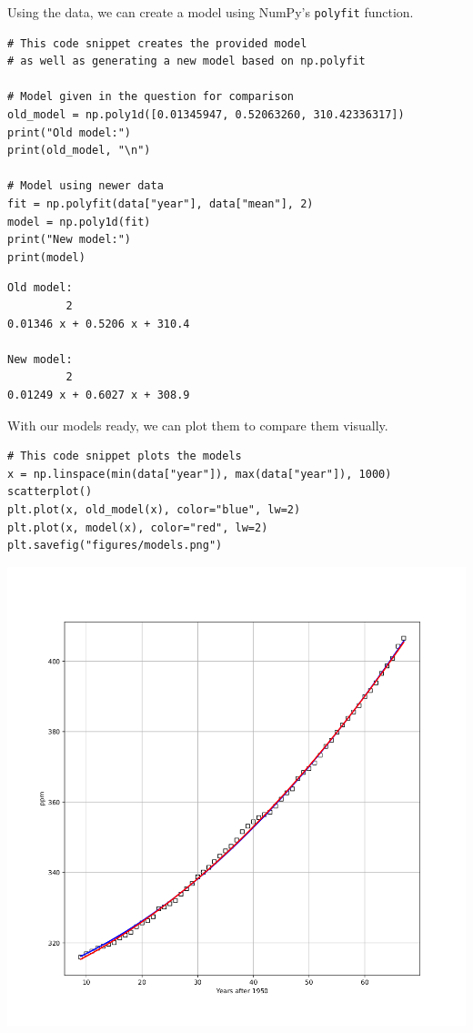 \documentclass[11pt]{article}
\begin{document}
Using the data, we can create a model using NumPy's \texttt{polyfit} function.

\begin{verbatim}
# This code snippet creates the provided model
# as well as generating a new model based on np.polyfit

# Model given in the question for comparison
old_model = np.poly1d([0.01345947, 0.52063260, 310.42336317])
print("Old model:")
print(old_model, "\n")

# Model using newer data
fit = np.polyfit(data["year"], data["mean"], 2)
model = np.poly1d(fit)
print("New model:")
print(model)
\end{verbatim}

\begin{verbatim}
Old model:
         2
0.01346 x + 0.5206 x + 310.4 

New model:
         2
0.01249 x + 0.6027 x + 308.9
\end{verbatim}

With our models ready, we can plot them to compare them visually.

\begin{verbatim}
# This code snippet plots the models
x = np.linspace(min(data["year"]), max(data["year"]), 1000)
scatterplot()
plt.plot(x, old_model(x), color="blue", lw=2)
plt.plot(x, model(x), color="red", lw=2)
plt.savefig("figures/models.png")
\end{verbatim}

\begin{center}
\includegraphics[width=.9\linewidth]{./figures/models.png}
\end{center}
\end{document}
